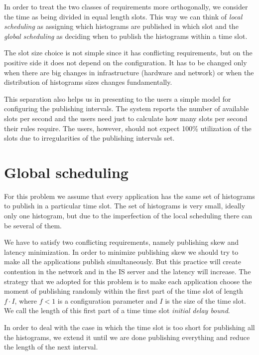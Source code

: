 In order to treat the two classes of requirements more orthogonally, we consider the time as being divided in equal length slots. This way we can think of \emph{local scheduling} as assigning which histograms are published in which slot and the \emph{global scheduling} as deciding when to publish the histograms within a time slot.

The slot size choice is not simple since it has conflicting requirements, but on the positive side it does not depend on the configuration. It has to be changed only when there are big changes in infrastructure (hardware and network) or when the distribution of histograms sizes changes fundamentally.

This separation also helps us in presenting to the users a simple model for configuring the publishing intervals. The system reports the number of available slots per second and the users need just to calculate how many slots per second their rules require. The users, however, should not expect 100\% utilization of the slots due to irregularities of the publishing intervals set.

\section{Global scheduling}

For this problem we assume that every application has the same set of histograms to publish in a particular time slot. The set of histograms is very small, ideally only one histogram, but due to the imperfection of the local scheduling there can be several of them.

We have to satisfy two conflicting requirements, namely publishing skew and latency minimization. In order to minimize publishing skew we should try to make all the applications publish simultaneously. But this practice will create contention in the network and in the IS server and the latency will increase. 
The strategy that we adopted for this problem is to make each application choose the moment of publishing randomly within the first part of the time slot of length $f\cdot I$, where $f<1$ is a configuration parameter and $I$ is the size of the time slot. We call the length of this first part of a time time slot \emph{initial delay bound}.

In order to deal with the case in which the time slot is too short for publishing all the histograms, we extend it until we are done publishing everything and reduce the length of the next interval.

